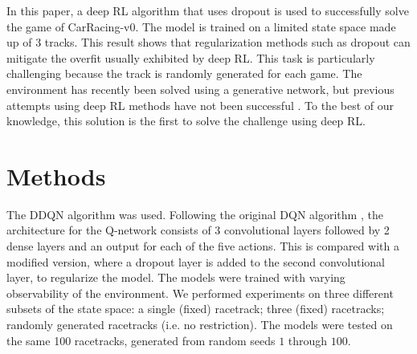 \documentclass{article}
\begin{document}
In this paper, a deep RL algorithm that uses dropout
\cite{Dropout} is used to successfully solve the game of
CarRacing-v0\cite{CarRacing}. The model is trained on a
limited state space made up of 3 tracks. This result shows that regularization methods such as 
dropout can mitigate the overfit usually exhibited by deep RL. This
task is particularly challenging because the track is randomly
generated for each game. The environment has recently been solved
using a generative network, but previous attempts using deep RL
methods have not been successful \cite{World_Models}
\cite{CarRacing1}. To the best of our knowledge, this solution is the
first to solve the challenge using deep RL.  

\section{Methods}
The DDQN algorithm \cite{DDQN} was used.
Following the original DQN algorithm \cite{DQN}, the architecture
for the Q-network consists of 3 convolutional layers followed by 2
dense layers and an output for each of the five actions.
This is compared with a modified version, where a dropout layer is
added to the second convolutional layer, to regularize the model.  
The models were trained with varying observability of the
environment. We performed experiments on three different subsets of
the state space: a single (fixed) racetrack; three (fixed) racetracks;
randomly generated racetracks (i.e. no restriction). The models were
tested on the same 100 racetracks, generated from random seeds $1$
through $100$.
\end{document}
